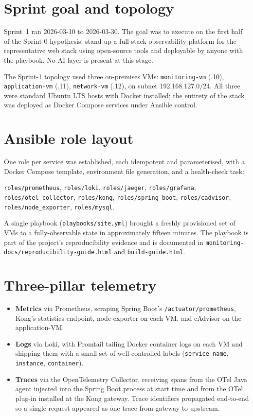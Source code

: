 \documentclass[11pt,a4paper,oneside]{report}
\begin{document}
\section{Sprint goal and topology}

Sprint~1 ran 2026-03-10 to 2026-03-30.  The goal was to execute on
the first half of the Sprint-0 hypothesis: stand up a full-stack
observability platform for the representative web stack using
open-source tools and deployable by anyone with the playbook.  No
AI layer is present at this stage.

The Sprint-1 topology used three on-premises VMs:
\texttt{monitoring-vm} (.10), \texttt{application-vm} (.11),
\texttt{network-vm} (.12), on subnet 192.168.127.0/24.  All three
were standard Ubuntu LTS hosts with Docker installed; the entirety
of the stack was deployed as Docker Compose services under Ansible
control.

\section{Ansible role layout}

One role per service was established, each idempotent and
parameterised, with a Docker Compose template, environment file
generation, and a health-check task:

\texttt{roles/prometheus}, \texttt{roles/loki}, \texttt{roles/jaeger},
\texttt{roles/grafana}, \texttt{roles/otel\_collector},
\texttt{roles/kong}, \texttt{roles/spring\_boot},
\texttt{roles/cadvisor}, \texttt{roles/node\_exporter},
\texttt{roles/mysql}.

A single playbook (\texttt{playbooks/site.yml}) brought a freshly
provisioned set of VMs to a fully-observable state in approximately
fifteen minutes.  The playbook is part of the project's
reproducibility evidence and is documented in
\texttt{monitoring-docs/reproducibility-guide.html} and
\texttt{build-guide.html}.

\section{Three-pillar telemetry}

\begin{itemize}
  \item \textbf{Metrics} via Prometheus, scraping Spring Boot's
        \texttt{/actuator/prometheus}, Kong's statistics endpoint,
        node-exporter on each VM, and cAdvisor on the
        application-VM.
  \item \textbf{Logs} via Loki, with Promtail tailing Docker container
        logs on each VM and shipping them with a small set of
        well-controlled labels (\texttt{service\_name},
        \texttt{instance}, \texttt{container}).
  \item \textbf{Traces} via the OpenTelemetry Collector, receiving
        spans from the OTel Java agent injected into the Spring Boot
        process at start time and from the OTel plug-in installed at
        the Kong gateway.  Trace identifiers propagated end-to-end so
        a single request appeared as one trace from gateway to
        upstream.
\end{itemize}
\end{document}
